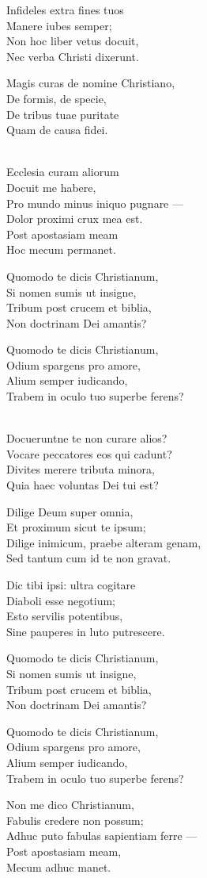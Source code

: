 \begin{lyrics}
Infideles extra fines tuos\\
Manere iubes semper;\\
Non hoc liber vetus docuit,\\
Nec verba Christi dixerunt.

Magis curas de nomine Christiano,\\
De formis, de specie,\\
De tribus tuae puritate\\
Quam de causa fidei.

\\
Ecclesia curam aliorum\\
Docuit me habere,\\
Pro mundo minus iniquo pugnare —\\
Dolor proximi crux mea est.\\
Post apostasiam meam\\
Hoc mecum permanet.

Quomodo te dicis Christianum,\\
Si nomen sumis ut insigne,\\
Tribum post crucem et biblia,\\
Non doctrinam Dei amantis?

Quomodo te dicis Christianum,\\
Odium spargens pro amore,\\
Alium semper iudicando,\\
Trabem in oculo tuo superbe ferens?

\\
Docueruntne te non curare alios?\\
Vocare peccatores eos qui cadunt?\\
Divites merere tributa minora,\\
Quia haec voluntas Dei tui est?

Dilige Deum super omnia,\\
Et proximum sicut te ipsum;\\
Dilige inimicum, praebe alteram genam,\\
Sed tantum cum id te non gravat.

Dic tibi ipsi: ultra cogitare\\
Diaboli esse negotium;\\
Esto servilis potentibus,\\
Sine pauperes in luto putrescere.

Quomodo te dicis Christianum,\\
Si nomen sumis ut insigne,\\
Tribum post crucem et biblia,\\
Non doctrinam Dei amantis?

Quomodo te dicis Christianum,\\
Odium spargens pro amore,\\
Alium semper iudicando,\\
Trabem in oculo tuo superbe ferens?

Non me dico Christianum,\\
Fabulis credere non possum;\\
Adhuc puto fabulas sapientiam ferre —\\
Post apostasiam meam,\\
Mecum adhuc manet.
\end{lyrics}

